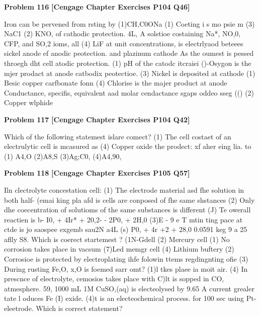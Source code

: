 \begin{problembox}
\textbf{Problem 116} \hfill \textbf{[Cengage Chapter Exercises P104 Q46]}
\label{q:ext-cng-th-116}

Iron can be pervened from rsting by
(1)CH,C0ONa
(1) Coeting i s mo psie m
(3) NaC1
(2) KNO,
of cathodic protection.
4L, A solstioe costaining Na*, NO,0, CFP, and SO,2 ioms, all
(4) LiF
at unit concentrations, is electrlyaod beteees sickel anode
ef anodic peotection.
and plazinum cathode As the oumest is pessed throegh dht
cell
atodic protection.
(1) pH of the catodc itcraiei
()-Osygon is the mjer prodact at anode
catbodix peotectioe.
(3) Nickel is deposited at cathode
(1) Besic copper carfbonate
fonn
(4) Chlorise is the majer product at anode
Conductance, specifis, equivalent aad molar cendactance
sgaps oddeo sseg (()
(2) Copper wlphide
\end{problembox}

\begin{problembox}
\textbf{Problem 117} \hfill \textbf{[Cengage Chapter Exercises P104 Q42]}
\label{q:ext-cng-th-117}

Which of the following statemest islare comect?
(1) The cell costaet of an electrulytic cell is mcasured as
(4) Copper oxide
the prodect: xf aher eing lia.
to
(1) A4,O
(2)A8,S
(3)Ag;C0, (4)A4,90,
\end{problembox}

\begin{problembox}
\textbf{Problem 118} \hfill \textbf{[Cengage Chapter Exercises P105 Q57]}
\label{q:ext-cng-th-118}

Iln clectrolyte concestation cell:
(1) The electrode material asd fhe solution in both half-
(emai king pla afd is
cells are conposed of fhe same shstances
(2) Only dhe coecentration of solutioms of the same
substances is different
(J) Te owerall reactien is
b- I0, + 4Ir* + 20,2-
-  2P0, + 2H,0
(3)E - 9
e T mtin ting pace at ctde is
jo saospee exgemb sau2N a4L (s)
P0, + 4r  +2  + 28,0
0.0591
keg 9 a 25 
aflly
S8. Which is  coerect startemest ?
(1N-Gdell
(2) Mercury cell
(1) No corrosion takes place in vacsum
(7)Led memgr cell
(4) Lithium buftery
(2) Corrosioe is protected by electroplating
 ihfe folowin ttems regdingnting ofie
(3) During rusting Fe,O, x,O is foemed
sarr omt?
(1)l tkes plaee ia moit air.
(4) In prescnce of electrolyte, cemosios takes place with
C)lt is sopped in CO, atmesphere.
59, 1000 mL 1M CuSO,(aq) is electeolysed by 9.65 A current
grealer tate
l oduces Fe (I) exide.
(4)t is an electeochemical process.
for 100 sec using Pt-eleetrode. Which is  correct
statement?
\end{problembox}

